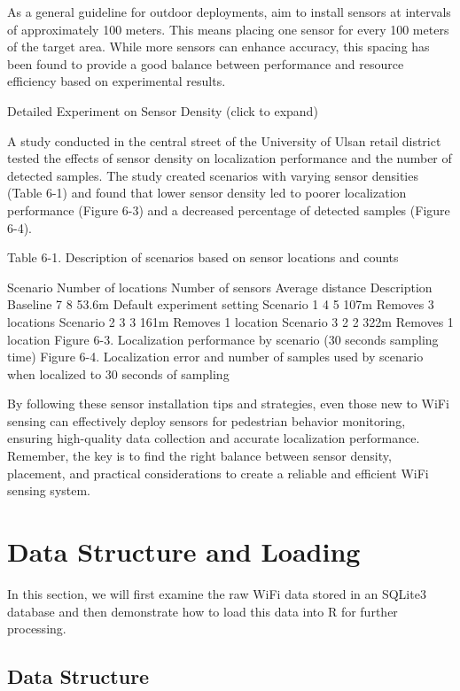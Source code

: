 \documentclass[
  letterpaper,
]{scrbook}
\begin{document}
As a general guideline for outdoor deployments, aim to install sensors
at intervals of approximately 100 meters. This means placing one sensor
for every 100 meters of the target area. While more sensors can enhance
accuracy, this spacing has been found to provide a good balance between
performance and resource efficiency based on experimental results.

Detailed Experiment on Sensor Density (click to expand)

A study conducted in the central street of the University of Ulsan
retail district tested the effects of sensor density on localization
performance and the number of detected samples. The study created
scenarios with varying sensor densities (Table 6-1) and found that lower
sensor density led to poorer localization performance (Figure 6-3) and a
decreased percentage of detected samples (Figure 6-4).

Table 6-1. Description of scenarios based on sensor locations and counts

Scenario Number of locations Number of sensors Average distance
Description Baseline 7 8 53.6m Default experiment setting Scenario 1 4 5
107m Removes 3 locations Scenario 2 3 3 161m Removes 1 location Scenario
3 2 2 322m Removes 1 location Figure 6-3. Localization performance by
scenario (30 seconds sampling time) Figure 6-4. Localization error and
number of samples used by scenario when localized to 30 seconds of
sampling

By following these sensor installation tips and strategies, even those
new to WiFi sensing can effectively deploy sensors for pedestrian
behavior monitoring, ensuring high-quality data collection and accurate
localization performance. Remember, the key is to find the right balance
between sensor density, placement, and practical considerations to
create a reliable and efficient WiFi sensing system.

\chapter{Data Structure and Loading}\label{data-structure-and-loading}

In this section, we will first examine the raw WiFi data stored in an
SQLite3 database and then demonstrate how to load this data into R for
further processing.

\section{Data Structure}\label{data-structure}
\end{document}
